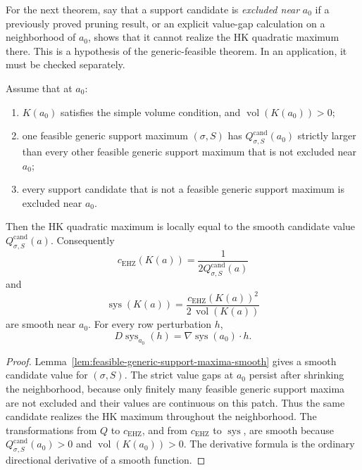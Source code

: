\begin{unverified}
For the next theorem, say that a support candidate is \emph{excluded near}
\(a_0\) if a previously proved pruning result, or an explicit value-gap
calculation on a neighborhood of \(a_0\), shows that it cannot realize the HK
quadratic maximum there. This is a hypothesis of the generic-feasible theorem.
In an application, it must be checked separately.

\begin{theorem}
\label{thm:smooth-sys-feasible-generic-candidate}
Assume that at \(a_0\):
\begin{enumerate}
\item \(K(a_0)\) satisfies the simple volume condition, and
  \(\operatorname{vol}(K(a_0))>0\);
\item one feasible generic support maximum \((\sigma,S)\) has
  \(Q^{\mathrm{cand}}_{\sigma,S}(a_0)\) strictly larger than every other
  feasible generic support maximum that is not excluded near \(a_0\);
\item every support candidate that is not a feasible generic support maximum is
  excluded near \(a_0\).
\end{enumerate}
Then the HK quadratic maximum is locally equal to the smooth candidate value
\(Q^{\mathrm{cand}}_{\sigma,S}(a)\). Consequently
\[
  c_{\mathrm{EHZ}}(K(a))
    = \frac{1}{2 Q^{\mathrm{cand}}_{\sigma,S}(a)}
\]
and
\[
  \operatorname{sys}(K(a))
    = \frac{c_{\mathrm{EHZ}}(K(a))^2}
           {2\,\operatorname{vol}(K(a))}
\]
are smooth near \(a_0\). For every row perturbation \(h\),
\[
  D\operatorname{sys}_{a_0}(h)
    = \nabla \operatorname{sys}(a_0)\cdot h .
\]
\end{theorem}

\begin{proof}
Lemma~\ref{lem:feasible-generic-support-maxima-smooth} gives a smooth candidate value for
\((\sigma,S)\). The strict value gaps at \(a_0\) persist after shrinking the
neighborhood, because only finitely many feasible generic support maxima are
not excluded and their values are continuous on this patch. Thus the same
candidate realizes the HK maximum throughout the neighborhood. The
transformations from \(Q\) to
\(c_{\mathrm{EHZ}}\), and from \(c_{\mathrm{EHZ}}\) to \(\operatorname{sys}\),
are smooth because \(Q^{\mathrm{cand}}_{\sigma,S}(a_0)>0\) and
\(\operatorname{vol}(K(a_0))>0\). The derivative formula is the ordinary
directional derivative of a smooth function.
\end{proof}


\end{unverified}
